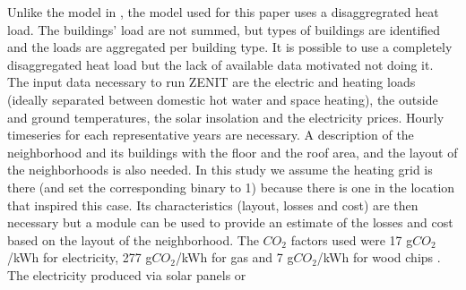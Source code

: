 \documentclass[conference]{IEEEtran}
\begin{document}
Unlike the model in , the model used for this paper uses a disaggregrated heat load. The buildings' load are not summed, but types of buildings are identified and the loads are aggregated per building type. It is possible to use a completely disaggregated heat load but the lack of available data motivated not doing it.
The input data necessary to run ZENIT are the electric and heating loads (ideally separated between domestic hot water and space heating), the outside and ground temperatures, the solar insolation and the electricity prices. Hourly timeseries for each representative years are necessary. A description of the neighborhood and its buildings with the floor and the roof area, and the layout of the neighborhoods is also needed.
In this study we assume the heating grid is there (and set the corresponding binary to 1) because there is one in the location that inspired this case. Its characteristics (layout, losses and cost) are then necessary but a module can be used to provide an estimate of the losses and cost based on the layout of the neighborhood. 
The $CO_2$ factors used were 17 g$CO_2$/kWh for electricity, 277 g$CO_2$/kWh for gas  and 7 g$CO_2$/kWh for wood chips . The electricity produced via solar panels or
\end{document}
